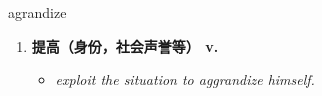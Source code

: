 
\begin{frame}
{\huge agrandize}
\begin{center}
\begin{enumerate}\Large
  \item \textbf{提高（身份，社会声誉等） v.}
  \begin{itemize}
    \item \em{\Large{exploit the situation to aggrandize himself.}}
  \end{itemize}
\end{enumerate}
\end{center}
\end{frame}
